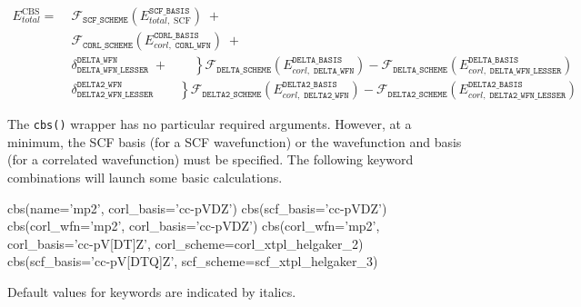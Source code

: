 \begin{align*}
E_{total}^{\text{CBS}} = \;
    & \mathcal{F}_{\texttt{SCF\_SCHEME}} \left(E_{total,\; \text{SCF}}^{\texttt{SCF\_BASIS}}\right) \; + \\
    & \mathcal{F}_{\texttt{CORL\_SCHEME}} \left(E_{corl,\; \texttt{CORL\_WFN}}^{\texttt{CORL\_BASIS}}\right) \; + \\
    & \left. \delta_{\texttt{DELTA\_WFN\_LESSER}}^{\texttt{DELTA\_WFN}} \; + 
        \qquad \right \} \mathcal{F}_{\texttt{DELTA\_SCHEME}} \left(E_{corl,\; \texttt{DELTA\_WFN}}^{\texttt{DELTA\_BASIS}}\right) - 
        \mathcal{F}_{\texttt{DELTA\_SCHEME}} \left(E_{corl,\; \texttt{DELTA\_WFN\_LESSER}}^{\texttt{DELTA\_BASIS}}\right) \\
    & \left. \delta_{\texttt{DELTA2\_WFN\_LESSER}}^{\texttt{DELTA2\_WFN}}
        \qquad \right \} \mathcal{F}_{\texttt{DELTA2\_SCHEME}} \left(E_{corl,\; \texttt{DELTA2\_WFN}}^{\texttt{DELTA2\_BASIS}}\right) - 
        \mathcal{F}_{\texttt{DELTA2\_SCHEME}} \left(E_{corl,\; \texttt{DELTA2\_WFN\_LESSER}}^{\texttt{DELTA2\_BASIS}}\right)
\end{align*}


The \texttt{cbs()} wrapper has no particular required arguments. 
However, at a minimum, the SCF basis (for a SCF wavefunction) or the wavefunction 
and basis (for a correlated wavefunction) must be specified. 
The following keyword combinations will launch some basic calculations.
\begin{Snippet}
cbs(name='mp2', corl_basis='cc-pVDZ')
cbs(scf_basis='cc-pVDZ')
cbs(corl_wfn='mp2', corl_basis='cc-pVDZ')
cbs(corl_wfn='mp2', corl_basis='cc-pV[DT]Z', corl_scheme=corl_xtpl_helgaker_2)
cbs(scf_basis='cc-pV[DTQ]Z', scf_scheme=scf_xtpl_helgaker_3)
\end{Snippet}


Default values for keywords are indicated by italics.

